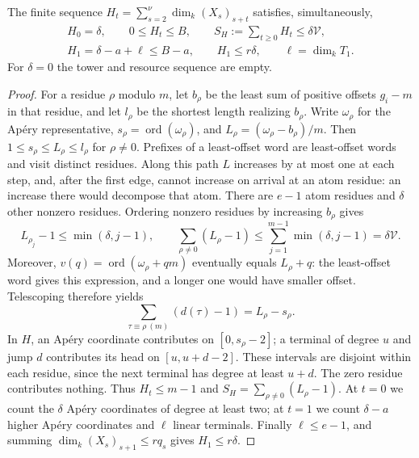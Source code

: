 \begin{lemma}\label{lem:ordinary-resources}
The finite sequence
$H_t=\sum_{s=2}^\nu\dim_k(X_s)_{s+t}$ satisfies, simultaneously,
\begin{equation}\label{eq:ordinary-resources}
 \begin{gathered}
 H_0=\delta,\qquad 0\le H_t\le B,\qquad
 S_H:=\sum_{t\ge0}H_t\le\delta\mathcal V,\\
 H_1=\delta-a+\ell\le B-a,\qquad H_1\le r\delta,
 \qquad \ell=\dim_kT_1.
 \end{gathered}
\end{equation}
For $\delta=0$ the tower and resource sequence are empty.
\end{lemma}

\begin{proof}
For a residue $\rho$ modulo $m$, let $b_\rho$ be the least sum of positive
offsets $g_i-m$ in that residue, and let $l_\rho$ be the shortest length
realizing $b_\rho$.  Write $\omega_\rho$ for the Ap\'ery representative,
$s_\rho=\operatorname{ord}(\omega_\rho)$, and
$L_\rho=(\omega_\rho-b_\rho)/m$.  Then
$1\le s_\rho\le L_\rho\le l_\rho$ for $\rho\ne0$.
Prefixes of a least-offset word are least-offset words and visit distinct
residues.  Along this path $L$ increases by at most one at each step,
and, after the first edge, cannot increase on arrival at an atom residue:
an increase there would decompose that atom. There are $e-1$ atom residues and $\delta$ other
nonzero residues.  Ordering nonzero residues by increasing $b_\rho$ gives
\[
 L_{\rho_j}-1\le\min(\delta,j-1),\qquad
 \sum_{\rho\ne0}(L_\rho-1)\le
 \sum_{j=1}^{m-1}\min(\delta,j-1)=\delta\mathcal V.
\]
Moreover, $v(q)=\operatorname{ord}(\omega_\rho+qm)$ eventually equals
$L_\rho+q$: the least-offset word gives this expression, and a longer
one would have smaller offset.  Telescoping therefore yields
\begin{equation}\label{eq:ordinary-terminal-budget}
 \sum_{\tau\equiv\rho\ (m)}(d(\tau)-1)=L_\rho-s_\rho.
\end{equation}
In $H$, an Ap\'ery coordinate contributes on $[0,s_\rho-2]$; a terminal
of degree $u$ and jump $d$ contributes its head on $[u,u+d-2]$.
These intervals are disjoint within each residue, since the next terminal
has degree at least $u+d$.  The zero residue contributes nothing.
Thus $H_t\le m-1$ and
$S_H=\sum_{\rho\ne0}(L_\rho-1)$.
At $t=0$ we count the $\delta$ Ap\'ery coordinates of degree at least two;
at $t=1$ we count $\delta-a$ higher Ap\'ery coordinates and $\ell$ linear
terminals.  Finally $\ell\le e-1$, and summing
$\dim_k(X_s)_{s+1}\le rq_s$ gives $H_1\le r\delta$.
\end{proof}

